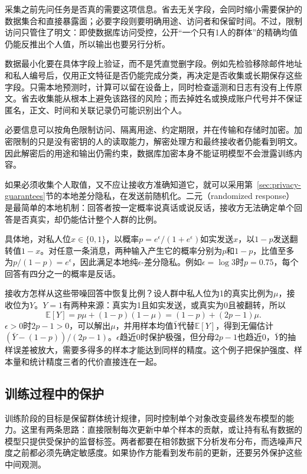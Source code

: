 采集之前先问任务是否真的需要这项信息。省去无关字段，会同时缩小需要保护的数据集合和直接暴露面；必要字段则要明确用途、访问者和保留时间。不过，限制访问只管住了明文：即使数据库访问受控，公开“一个只有1人的群体”的精确均值仍能反推出个人值，所以输出也要另行分析。

数据最小化要在具体字段上验证，而不是凭直觉删字段。例如先检验移除邮件地址和私人编号后，仅用正文特征是否仍能完成分类，再决定是否收集或长期保存这些字段。只需本地预测时，计算可以留在设备上，同时检查遥测和日志有没有上传原文。省去收集能从根本上避免该路径的风险；而去掉姓名或换成账户代号并不保证匿名，正文、时间和关联记录仍可能识别出个人。

必要信息可以按角色限制访问、隔离用途、约定期限，并在传输和存储时加密。加密限制的只是没有密钥的人的读取能力，解密处理方和最终接收者仍能看到明文。因此解密后的用途和输出仍需约束，数据库加密本身不能证明模型不会泄露训练内容。

如果必须收集个人取值，又不应让接收方准确知道它，就可以采用第~\ref{sec:privacy-guarantees}节的本地差分隐私，在发送前随机化。二元（randomized response）是最简单的本地机制：回答者按一定概率说真话或说反话，接收方无法确定单个回答是否真实，却仍能估计整个人群的比例。

具体地，对私人位$x\in\{0,1\}$，以概率$p=e^\epsilon/(1+e^\epsilon)$如实发送$x$，以$1-p$发送翻转值$1-x$。对任意一条消息，两种输入产生它的概率分别为$p$和$1-p$，比值至多为$p/(1-p)=e^\epsilon$，因此满足本地纯$\epsilon$-差分隐私。例如$\epsilon=\log3$时$p=0.75$，每个回答有四分之一的概率是反话。

接收方怎样从这些带噪回答中恢复比例？设人群中私人位为1的真实比例为$\mu$，接收位为$Y$。$Y=1$有两种来源：真实为1且如实发送，或真实为0且被翻转，所以
\[
 \mathbb E[Y]=p\mu+(1-p)(1-\mu)=(1-p)+(2p-1)\mu.
\]
$\epsilon>0$时$2p-1>0$，可以解出$\mu$，并用样本均值$\bar Y$代替$\mathbb E[Y]$，得到无偏估计$(\bar Y-(1-p))/(2p-1)$。$\epsilon$趋近0时保护极强，但分母$2p-1$也趋近0，$\bar Y$的抽样误差被放大，需要多得多的样本才能达到同样的精度。这个例子把保护强度、样本量和统计精度三者的代价直接连在一起。

\subsection{训练过程中的保护}
\label{sec:privacy-training-influence}

训练阶段的目标是保留群体统计规律，同时控制单个对象改变最终发布模型的能力。这里有两条思路：直接限制每次更新中单个样本的贡献，或让持有私有数据的模型只提供受保护的监督标签。两者都要在相邻数据下分析发布分布，而选噪声尺度之前都必须先确定敏感度。如果协作方能看到发布前的更新，还要另外保护这些中间观测。

